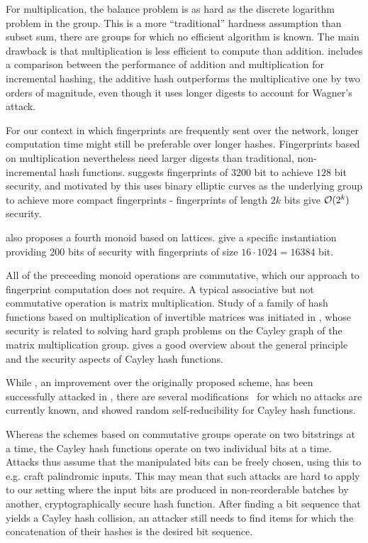 For multiplication, the balance problem is as hard as the discrete logarithm problem in the group. This is a more ``traditional'' hardness assumption than subset sum, there are groups for which no efficient algorithm is known. The main drawback is that multiplication is less efficient to compute than addition. \cite{stanton2010fastad} includes a comparison between the performance of addition and multiplication for incremental hashing, the additive hash outperforms the multiplicative one by two orders of magnitude, even though it uses longer digests to account for Wagner's attack.

For our context in which fingerprints are frequently sent over the network, longer computation time might still be preferable over longer hashes. Fingerprints based on multiplication nevertheless need larger digests than traditional, non-incremental hash functions. \cite{maitin2017elliptic} suggests fingerprints of $3200$ bit to achieve $128$ bit security, and motivated by this uses binary elliptic curves as the underlying group to achieve more compact fingerprints - fingerprints of length $2k$ bits give $\mathcal{O}(2^k)$ security.

\cite{bellare1997new} also proposes a fourth monoid based on lattices. \cite{lewi2019securing} give a specific instantiation providing 200 bits of security with fingerprints of size $16 \cdot 1024 = 16384$ bit.

All of the preceeding monoid operations are commutative, which our approach to fingerprint computation does not require. A typical associative but not commutative operation is matrix multiplication. Study of a family of hash functions based on multiplication of invertible matrices was initiated in \cite{zemor1991hash}, whose security is related to solving hard graph problems on the Cayley graph of the matrix multiplication group. \cite{petit2011rubik} gives a good overview about the general principle and the security aspects of Cayley hash functions.

While \cite{tillich1994hashing}, an improvement over the originally proposed scheme, has been successfully attacked in \cite{grassl2011cryptanalysis}\cite{petit2010preimages}, there are several modifications~\cite{petit2009graph}\cite{bromberg2017navigating}\cite{sosnovski2016cayley} for which no attacks are currently known, and \cite{mullan2016text} showed random self-reducibility for Cayley hash functions.

Whereas the schemes based on commutative groups operate on two bitstrings at a time, the Cayley hash functions operate on two individual bits at a time. Attacks thus assume that the manipulated bits can be freely chosen, using this to e.g. craft palindromic inputs. This may mean that such attacks are hard to apply to our setting where the input bits are produced in non-reorderable batches by another, cryptographically secure hash function. After finding a bit sequence that yields a Cayley hash collision, an attacker still needs to find items for which the concatenation of their hashes is the desired bit sequence.

